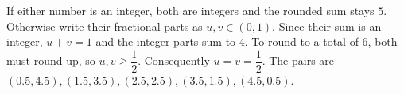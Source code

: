If either number is an integer, both are integers and the rounded sum stays $5$. Otherwise write their fractional parts as $u,v\in(0,1)$. Since their sum is an integer, $u+v=1$ and the integer parts sum to $4$. To round to a total of $6$, both must round up, so $u,v\ge\dfrac{1}{2}$. Consequently $u=v=\dfrac{1}{2}$. The pairs are $\boxed{(0.5,4.5),(1.5,3.5),(2.5,2.5),(3.5,1.5),(4.5,0.5)}$.
